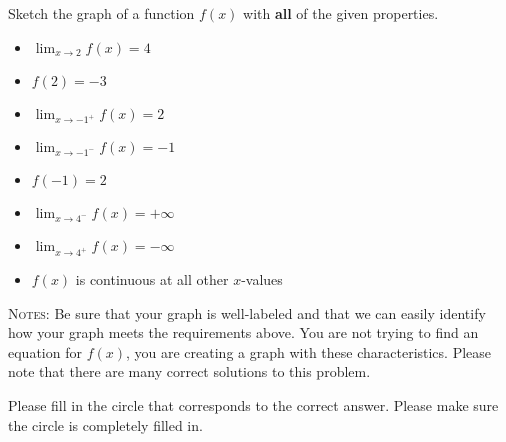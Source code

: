 \documentclass[addpoints,12pt]{exam}
\begin{document}
\begin{questions}

\question[7] Sketch the graph of a function $f(x)$ with \textbf{all} of the given properties.





\begin{itemize}
\item $\displaystyle{\lim_{x\to 2} f(x) = 4}$
\item $f(2) = -3$
\item $\displaystyle{\lim_{x\to -1^{+}} f(x) = 2}$
\item $\displaystyle{\lim_{x\to -1^{-}} f(x) = -1}$
\item $f(-1)=2$
\item $\displaystyle{\lim_{x\to 4^{-}} f(x) = +\infty}$
\item $\displaystyle{\lim_{x\to 4^{+}} f(x) = -\infty}$
\item $f(x)$ is continuous at all other $x$-values
\end{itemize}

\noindent\textsc{Notes:} Be sure that your graph is well-labeled and that we can easily identify
how your graph meets the requirements above. You are not trying to find an equation for $f(x)$,
you are creating a graph with these characteristics. Please note that there are many correct
solutions to this problem.

\begin{center}

\end{center}



\vfill

\newpage




\question[8] Please fill in the circle that corresponds to the correct answer. Please make sure
the circle is completely filled in.




\begin{parts}


\end{parts}
\end{questions}
\end{document}
